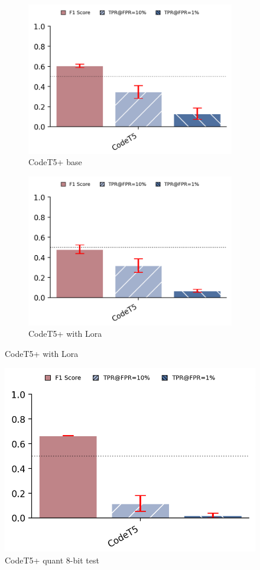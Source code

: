 \begin{figure}[H]
    \begin{subfigure}[b]{0.45\textwidth}
        \centering
        \includegraphics[width=\linewidth]{img/TEST/CodeT5/CodemirageAIG/noolora.png}
        \caption{CodeT5+ base}
        \label{fig:NOLora}
    \end{subfigure}
    \hfill
    \begin{subfigure}[b]{0.45\textwidth}
        \centering
        \includegraphics[width=\linewidth]{img/lorap.png}
        \caption{CodeT5+ with Lora}
        \label{fig:Lora}
    \end{subfigure}
\end{figure}
\begin{figure}[H]
    \centering
    \includegraphics[width=0.5\linewidth]{img/quant.png}
    \caption{CodeT5+ quant 8-bit test}
    \label{fig:quant}
\end{figure}